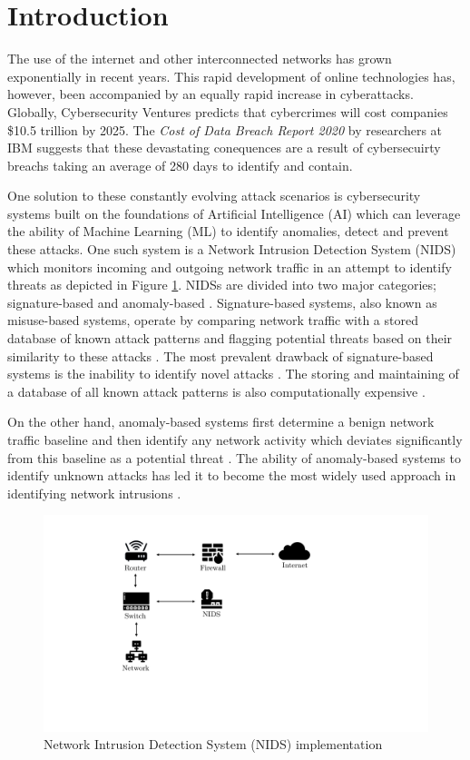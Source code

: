 \documentclass[conference]{IEEEtran}
\begin{document}
\section{Introduction}
The use of the internet and other interconnected networks has grown exponentially in recent years. This rapid development of online technologies has, however, been accompanied by an equally rapid increase in cyberattacks. Globally, Cybersecurity Ventures predicts that cybercrimes will cost companies \$10.5 trillion by 2025. The \textit{Cost of Data Breach Report 2020} by researchers at IBM suggests that these devastating conequences are a result of cybersecuirty breachs taking an average of 280 days to identify and contain.

One solution to these constantly evolving attack scenarios is cybersecurity systems built on the foundations of Artificial Intelligence (AI) which can leverage the ability of Machine Learning (ML) to identify anomalies, detect and prevent these attacks. One such system is a Network Intrusion Detection System (NIDS) which monitors incoming and outgoing network traffic in an attempt to identify threats as depicted in Figure \ref{NIDS_implement}.
NIDSs are divided into two major categories; signature-based and anomaly-based \cite{b2}. Signature-based systems, also known as misuse-based systems, operate by comparing network traffic with a stored database of known attack patterns and flagging potential threats based on their similarity to these attacks \cite{b3}. The most prevalent drawback of signature-based systems is the inability to identify novel attacks \cite{b1}. The storing and maintaining of a database of all known attack patterns is also computationally expensive \cite{b4}.

On the other hand, anomaly-based systems first determine a benign network traffic baseline and then identify any network activity which deviates significantly from this baseline as a potential threat \cite{b5}. The ability of anomaly-based systems to identify unknown attacks has led it to become the most widely used approach in identifying network intrusions \cite{b6}.

\begin{figure}[htbp]
\centerline{\includegraphics[scale=0.25]{images/diagram.pdf}}
\caption{Network Intrusion Detection System (NIDS) implementation}
\label{NIDS_implement}
\end{figure}
\end{document}
